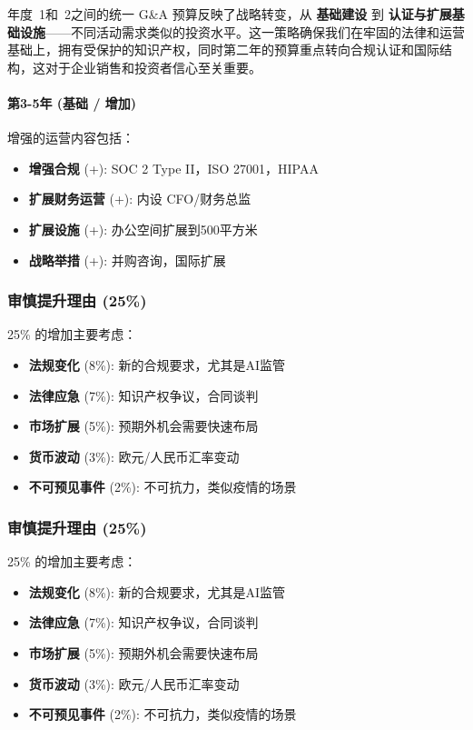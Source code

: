 \documentclass[11点, A4纸, 单面]{article}
\begin{document}
年度~1和~2之间的统一 G\&A 预算反映了战略转变，从 \textbf{基础建设} 到 \textbf{认证与扩展基础设施}——不同活动需求类似的投资水平。这一策略确保我们在牢固的法律和运营基础上，拥有受保护的知识产权，同时第二年的预算重点转向合规认证和国际结构，这对于企业销售和投资者信心至关重要。

\paragraph{第3-5年 (基础 / 增加)}
增强的运营内容包括：
\begin{itemize}
    \item \textbf{增强合规} (+): SOC 2 Type II，ISO 27001，HIPAA
    \item \textbf{扩展财务运营} (+): 内设 CFO/财务总监
    \item \textbf{扩展设施} (+): 办公空间扩展到500平方米
    \item \textbf{战略举措} (+): 并购咨询，国际扩展
\end{itemize}

\subsubsection{审慎提升理由 (25\%)}
25\% 的增加主要考虑：
\begin{itemize}
    \item \textbf{法规变化} (8\%): 新的合规要求，尤其是AI监管
    \item \textbf{法律应急} (7\%): 知识产权争议，合同谈判
    \item \textbf{市场扩展} (5\%): 预期外机会需要快速布局
    \item \textbf{货币波动} (3\%): 欧元/人民币汇率变动
    \item \textbf{不可预见事件} (2\%): 不可抗力，类似疫情的场景
\end{itemize}
\subsubsection{审慎提升理由 (25\%)}
25\% 的增加主要考虑：
\begin{itemize}
    \item \textbf{法规变化} (8\%): 新的合规要求，尤其是AI监管
    \item \textbf{法律应急} (7\%): 知识产权争议，合同谈判
    \item \textbf{市场扩展} (5\%): 预期外机会需要快速布局
    \item \textbf{货币波动} (3\%): 欧元/人民币汇率变动
    \item \textbf{不可预见事件} (2\%): 不可抗力，类似疫情的场景
\end{itemize}
\end{document}
